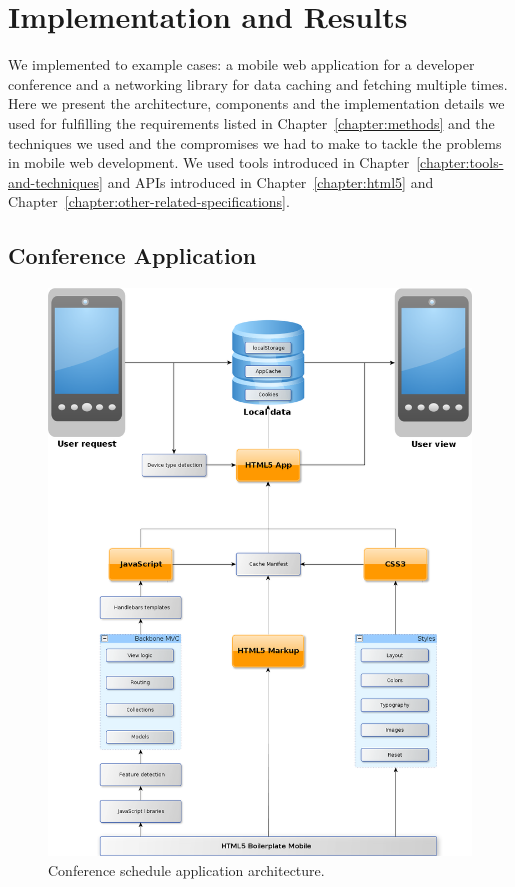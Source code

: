 \chapter{Implementation and Results}
\label{chapter:implementation}

We implemented to example cases: a mobile web application for a
developer conference and a networking library for data caching and
fetching multiple times. Here we present the architecture, components
and the implementation details we used for fulfilling the requirements
listed in Chapter~\ref{chapter:methods} and the techniques we used and
the compromises we had to make to tackle the problems in mobile web
development. We used tools introduced in
Chapter~\ref{chapter:tools-and-techniques} and APIs introduced in
Chapter~\ref{chapter:html5} and
Chapter~\ref{chapter:other-related-specifications}.


\section{Conference Application}

\begin{figure}[ht]
  \begin{center}
    \includegraphics[width=\textwidth]{images/devdays.png}
    \caption{Conference schedule application architecture.}
    \label{figure:devdays.png}
  \end{center}
\end{figure}

